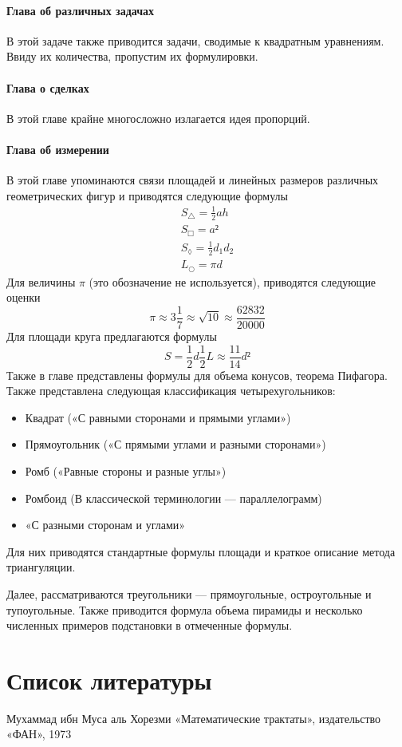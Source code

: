 \documentclass[unicode, 10pt, a4paper, oneside, fleqn]{article}
\newcommand{\half}{\ensuremath{{\scriptstyle\frac{1}{2}}}}
\begin{document}
\paragraph{Глава об различных задачах}
В этой задаче также приводится задачи, сводимые
к квадратным уравнениям. Ввиду их количества,
пропустим их формулировки.
\paragraph{Глава о сделках}
В этой главе крайне многосложно излагается идея
пропорций.
\paragraph{Глава об измерении}
В этой главе упоминаются связи площадей и линейных размеров
различных геометрических фигур и приводятся следующие формулы
\begin{gather}
  S_△ = {\scriptstyle\frac{1}{2}}ah \\
  S_□ = a² \\
  S_◊ = {\scriptstyle\frac{1}{2}}d_1d_2 \\
  L_○= πd
\end{gather}
Для величины $π$ (это обозначение не используется),
приводятся следующие оценки
\begin{displaymath}
  π≈3{\scriptstyle\frac{1}{7}}≈\sqrt{10} ≈\frac{62832}{20000}
\end{displaymath}
Для площади круга предлагаются формулы
\begin{displaymath}
  S = \half d \half L ≈ \frac{11}{14}d²
\end{displaymath}
Также в главе представлены формулы для объема конусов,
теорема Пифагора. Также представлена следующая классификация
четырехугольников:
\begin{itemize}
\item Квадрат («С равными сторонами и прямыми углами»)
\item Прямоугольник («С прямыми углами и разными сторонами»)
\item  Ромб («Равные стороны и разные углы»)
\item Ромбоид (В классической терминологии — параллелограмм)
\item «С разными сторонам и углами»
\end{itemize}
Для них приводятся стандартные формулы площади и
краткое описание метода триангуляции.

Далее, рассматриваются треугольники — прямоугольные,
остроугольные и тупоугольные. Также  приводится формула
объема пирамиды и несколько численных примеров подстановки
в отмеченные формулы.
\section{Список литературы}
\par
Мухаммад ибн Муса аль Хорезми «Математические трактаты»,
издательство «ФАН», 1973
\end{document}
